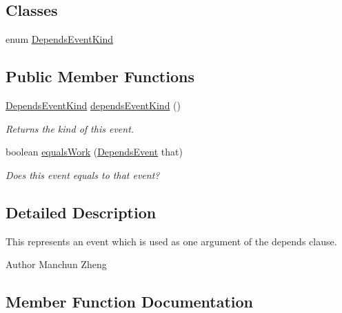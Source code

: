 \subsection*{Classes}
\begin{DoxyCompactItemize}
\item 
enum \hyperlink{enumedu_1_1udel_1_1cis_1_1vsl_1_1civl_1_1model_1_1IF_1_1contract_1_1DependsEvent_1_1DependsEventKind}{Depends\+Event\+Kind}
\end{DoxyCompactItemize}
\subsection*{Public Member Functions}
\begin{DoxyCompactItemize}
\item 
\hyperlink{enumedu_1_1udel_1_1cis_1_1vsl_1_1civl_1_1model_1_1IF_1_1contract_1_1DependsEvent_1_1DependsEventKind}{Depends\+Event\+Kind} \hyperlink{interfaceedu_1_1udel_1_1cis_1_1vsl_1_1civl_1_1model_1_1IF_1_1contract_1_1DependsEvent_a8ed7df832dfbae322cdccaa48f5bfd32}{depends\+Event\+Kind} ()
\begin{DoxyCompactList}\small\item\em Returns the kind of this event. \end{DoxyCompactList}\item 
boolean \hyperlink{interfaceedu_1_1udel_1_1cis_1_1vsl_1_1civl_1_1model_1_1IF_1_1contract_1_1DependsEvent_a99e451d0530a7a8b6215d5518f51db05}{equals\+Work} (\hyperlink{interfaceedu_1_1udel_1_1cis_1_1vsl_1_1civl_1_1model_1_1IF_1_1contract_1_1DependsEvent}{Depends\+Event} that)
\begin{DoxyCompactList}\small\item\em Does this event equals to that event? \end{DoxyCompactList}\end{DoxyCompactItemize}


\subsection{Detailed Description}
This represents an event which is used as one argument of the {\ttfamily depends} clause. 

\begin{DoxyAuthor}{Author}
Manchun Zheng 
\end{DoxyAuthor}


\subsection{Member Function Documentation}
\hypertarget{interfaceedu_1_1udel_1_1cis_1_1vsl_1_1civl_1_1model_1_1IF_1_1contract_1_1DependsEvent_a8ed7df832dfbae322cdccaa48f5bfd32}{}
